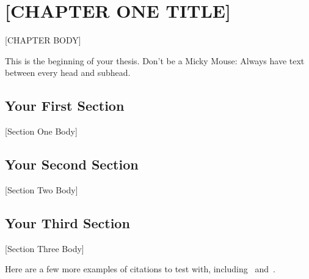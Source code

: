 \chapter{[CHAPTER ONE TITLE]}
[CHAPTER BODY]

This is the beginning of your thesis. Don't be a Micky
Mouse\cite{mm2}: Always have text between every head and subhead.

\section{Your First Section}
[Section One Body]
\section{Your Second Section}
[Section Two Body]
\section{Your Third Section}
[Section Three Body]


Here are a few more examples of citations to test with, including~\cite{ChungEtAl2011} and~\cite{Anisi2004}.